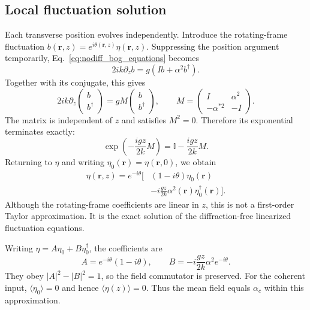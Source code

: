 \documentclass[%
 reprint,
 amsmath,amssymb,
 aps,
pra,
twocolumn,
]{revtex4-2}
\begin{document}
\subsection{Local fluctuation solution}

Each transverse position evolves independently. Introduce the rotating-frame fluctuation $b(\mathbf r,z)=e^{i\theta(\mathbf r,z)}\eta(\mathbf r,z)$. Suppressing the position argument temporarily, Eq.~\eqref{eq:nodiff_bog_equations} becomes
\begin{equation}
    2ik\partial_z b=g\left(Ib+\alpha^2b^\dagger\right).
\end{equation}
Together with its conjugate, this gives
\begin{equation}
    2ik\partial_z\begin{pmatrix}b\\b^\dagger\end{pmatrix}
       =gM\begin{pmatrix}b\\b^\dagger\end{pmatrix},
    \qquad
    M=\begin{pmatrix}I&\alpha^2\\-\alpha^{*2}&-I\end{pmatrix}.
\end{equation}
The matrix is independent of $z$ and satisfies $M^2=0$. Therefore its exponential terminates exactly:
\begin{equation}
    \exp\left(-\frac{igz}{2k}M\right)
       =\mathbb I-\frac{igz}{2k}M.
\end{equation}
Returning to $\eta$ and writing $\eta_0(\mathbf r)=\eta(\mathbf r,0)$, we obtain
\begin{equation}
\begin{aligned}
    \eta(\mathbf r,z)=e^{-i\theta}\bigg[&(1-i\theta)\eta_0(\mathbf r)\\
       &-i\frac{gz}{2k}\alpha^2(\mathbf r)\eta_0^\dagger(\mathbf r)\bigg].
\end{aligned}
    \label{eq:nodiff_fluctuation_solution}
\end{equation}
Although the rotating-frame coefficients are linear in $z$, this is not a first-order Taylor approximation. It is the exact solution of the diffraction-free linearized fluctuation equations.

Writing $\eta=A\eta_0+B\eta_0^\dagger$, the coefficients are
\begin{equation}
    A=e^{-i\theta}(1-i\theta),\qquad
    B=-i\frac{gz}{2k}\alpha^2e^{-i\theta}.
\end{equation}
They obey $|A|^2-|B|^2=1$, so the field commutator is preserved. For the coherent input, $\langle\eta_0\rangle=0$ and hence $\langle\eta(z)\rangle=0$. Thus the mean field equals $\alpha_c$ within this approximation.
\end{document}
